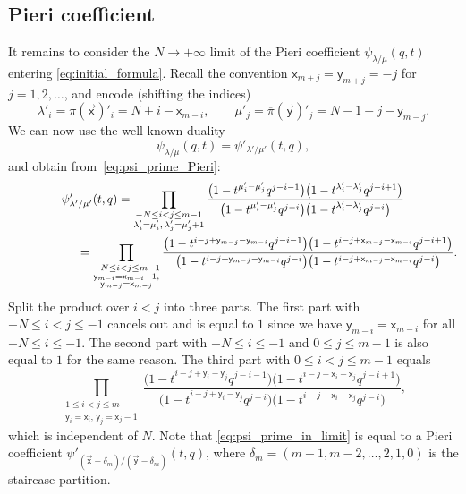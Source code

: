 \documentclass[11pt]{article}
\numberwithin{equation}{section}
\numberwithin{equation}{section}
\begin{document}
\subsection{Pieri coefficient}

It remains to consider the $N\to+\infty$ limit of the Pieri
coefficient $\psi_{\lambda/\mu}(q,t)$
entering \eqref{eq:initial_formula}.
Recall the convention
$\mathsf{x}_{m+j}=\mathsf{y}_{m+j}
=-j$ for $j=1,2,\dots $,
and encode (shifting the indices)
\begin{equation*}
	\lambda'_i=\pi(\vec{\mathsf{x}})'_i=N+i-\mathsf{x}_{m-i},
	\qquad
	\mu'_j=\overline\pi(\vec{\mathsf{y}})'_j=N-1+j-\mathsf{y}_{m-j}.
\end{equation*}
We can now use
the well-known duality
\cite[proof of formula~(6.24)]{Macdonald1995}
\begin{equation*}
	\psi_{\lambda/\mu}(q,t)=
	\psi'_{\lambda'/\mu'}(t,q),
\end{equation*}
and obtain from~\eqref{eq:psi_prime_Pieri}:
\begin{gather*}
	\psi'_{\lambda'/\mu'}(t,q)
	=
	\prod_{\substack{-N\le i<j\le m-1
	\\
	\lambda'_{i}=\mu'_{i},\, \lambda'_{j}=\mu'_{j}+1}}
	\frac{\big(1-t^{\mu'_{i}-\mu'_{j}} q^{j-i-1}\big)\big(1-t^{\lambda'_{i}-\lambda'_{j}} q^{j-i+1}\big)}
	{\big(1-t^{\mu'_{i}-\mu'_{j}} q^{j-i}\big)\big(1-t^{\lambda'_{i}-\lambda'_{j}} q^{j-i}\big)}
	\\
\hphantom{\psi'_{\lambda'/\mu'}(t,q)=}{}
=
	\prod_{\substack{-N\le i<j\le m-1
	\\
	\mathsf{y}_{m-i}=\mathsf{x}_{m-i}-1,\\
	\mathsf{y}_{m-j}=\mathsf{x}_{m-j}}}
	\frac{\big(1-t^{i-j+\mathsf{y}_{m-j}-\mathsf{y}_{m-i}}
	q^{j-i-1}\big)
	\big(1-t^{i-j+\mathsf{x}_{m-j}-\mathsf{x}_{m-i}} q^{j-i+1}\big)}
	{\big(1-t^{i-j+\mathsf{y}_{m-j}-\mathsf{y}_{m-i}} q^{j-i}\big)
	\big(1-t^{i-j+\mathsf{x}_{m-j}-\mathsf{x}_{m-i}} q^{j-i}\big)}.
\end{gather*}
Split the product over $i<j$ into three parts.
The first part with $-N\le i<j\le -1$
cancels out and is equal to $1$
since
we have $\mathsf{y}_{m-i}=\mathsf{x}_{m-i}$ for all $-N\le i\le -1$.
The second part
with $-N\le i\le -1$ and $0\le j\le m-1$ is also equal to $1$ for the same reason.
The third part with $0\le i<j\le m-1$ equals
\begin{equation}
	\label{eq:psi_prime_in_limit}
	\prod_{\substack{1\le i<j\le m
	\\
	\mathsf{y}_{i}=\mathsf{x}_{i}
	,\,
	\mathsf{y}_{j}=\mathsf{x}_{j}-1}}
	\frac{\big(1-t^{i-j+\mathsf{y}_{i}-\mathsf{y}_{j}}
	q^{j-i-1}\big)
	\big(1-t^{i-j+\mathsf{x}_{i}-\mathsf{x}_{j}} q^{j-i+1}\big)}
	{\big(1-t^{i-j+\mathsf{y}_{i}-\mathsf{y}_{j}} q^{j-i}\big)
	\big(1-t^{i-j+\mathsf{x}_{i}-\mathsf{x}_{j}} q^{j-i}\big)},
\end{equation}
which is independent of $N$. Note that
\eqref{eq:psi_prime_in_limit} is equal to a Pieri coefficient
$\psi'_{(\vec{\mathsf{x}}-\delta_m)/(\vec{\mathsf{y}}-\delta_m)}(t,q)$,
where $\delta_m=(m-1,m-2,\dots,2,1,0)$ is the
staircase partition.
\end{document}
